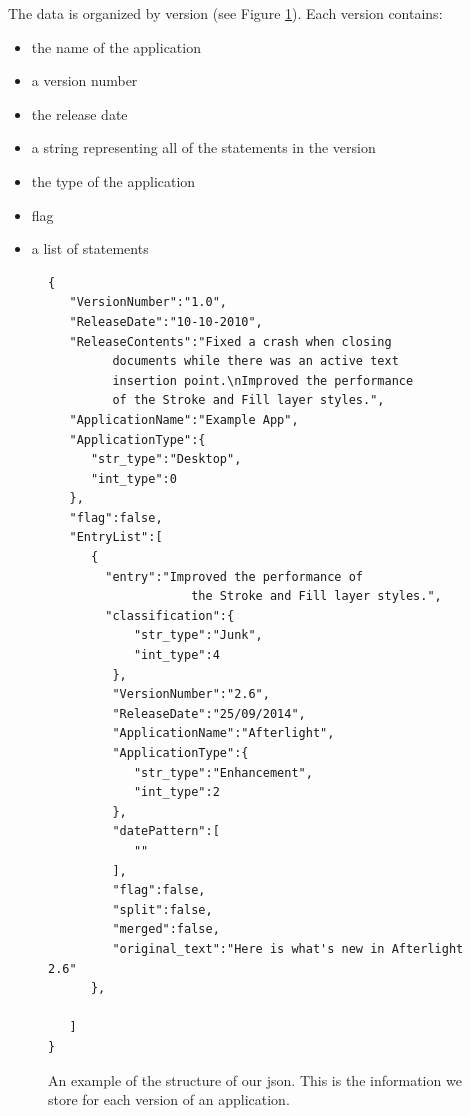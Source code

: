 \documentclass{acm_proc_article-sp}
\begin{document}
The data is organized by version (see Figure \ref{fig:jsonEx}). Each version contains: 
\begin{itemize}
	\item the name of the application
	\item a version number
	\item the release date
	\item a string representing all of the statements in the version
	\item the type of the application
	\item flag
	\item a list of statements
\end{itemize}


\begin{figure}
\begin{verbatim}
{  
   "VersionNumber":"1.0",
   "ReleaseDate":"10-10-2010",
   "ReleaseContents":"Fixed a crash when closing
   		 documents while there was an active text 
   		 insertion point.\nImproved the performance 
   		 of the Stroke and Fill layer styles.",
   "ApplicationName":"Example App",
   "ApplicationType":{  
      "str_type":"Desktop",
      "int_type":0
   },
   "flag":false,
   "EntryList":[  
      {  
 		"entry":"Improved the performance of 
 		         	the Stroke and Fill layer styles.",
        "classification":{  
            "str_type":"Junk",
            "int_type":4
         },
         "VersionNumber":"2.6",
         "ReleaseDate":"25/09/2014",
         "ApplicationName":"Afterlight",
         "ApplicationType":{  
            "str_type":"Enhancement",
            "int_type":2
         },
         "datePattern":[  
            ""
         ],
         "flag":false,
         "split":false,
         "merged":false,
         "original_text":"Here is what's new in Afterlight 2.6"
      },
    
   ]
}
\end{verbatim}
\caption{An example of the structure of our json. This is the information we store for each version of an application.}
\label{fig:jsonEx}
\end{figure}
\end{document}
